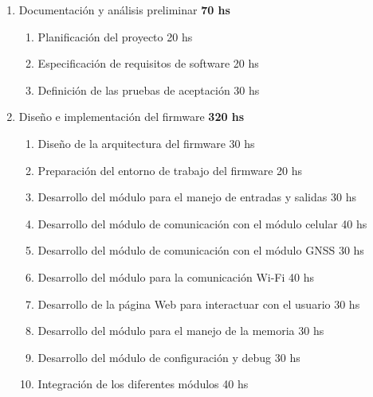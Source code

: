 \documentclass[
11pt, %
]{charter}
\begin{document}
\begin{enumerate}
\item Documentación y análisis preliminar								\hspace*{\fill}\textbf{70 hs}
	\begin{enumerate}
	\item Planificación del proyecto 									\hspace*{\fill}20 hs
	\item Especificación de requisitos de software 						\hspace*{\fill}20 hs
	\item Definición de las pruebas de aceptación						\hspace*{\fill}30 hs
	\end{enumerate}
\item Diseño e implementación del firmware								\hspace*{\fill}\textbf{320 hs}
	\begin{enumerate}
	\item Diseño de la arquitectura del firmware						\hspace*{\fill}30 hs
	\item Preparación del entorno de trabajo del firmware				\hspace*{\fill}20 hs
	\item Desarrollo del módulo para el manejo de entradas y salidas	\hspace*{\fill}30 hs
	\item Desarrollo del módulo de comunicación con el módulo celular	\hspace*{\fill}40 hs
	\item Desarrollo del módulo de comunicación con el módulo GNSS		\hspace*{\fill}30 hs
	\item Desarrollo del módulo para la comunicación Wi-Fi				\hspace*{\fill}40 hs
	\item Desarrollo de la página Web para interactuar con el usuario	\hspace*{\fill}30 hs
	\item Desarrollo del módulo para el manejo de la memoria			\hspace*{\fill}30 hs
	\item Desarrollo del módulo de configuración y debug				\hspace*{\fill}30 hs
	\item Integración de los diferentes módulos							\hspace*{\fill}40 hs	

\end{enumerate}
\end{enumerate}
\end{document}
